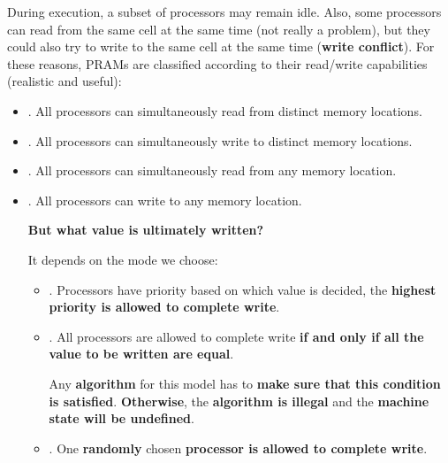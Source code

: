 During execution, a subset of processors may remain idle. Also, some processors can read from the same cell at the same time (not really a problem), but they could also try to write to the same cell at the same time (\textbf{write conflict}). For these reasons, PRAMs are classified according to their read/write capabilities (realistic and useful):
\begin{itemize}
    \item {}. All processors can simultaneously read from distinct memory locations.
    
    \item {}. All processors can simultaneously write to distinct memory locations.
    
    \item {}. All processors can simultaneously read from any memory location.

    \item {}. All processors can write to any memory location.
    \begin{flushleft}
        \textcolor{Green3}{ \textbf{But what value is ultimately written?}}
    \end{flushleft}
    It depends on the mode we choose:
    \begin{itemize}
        \item {}. Processors have priority based on which value is decided, the \textbf{highest priority is allowed to complete write}.

        \item {}. All processors are allowed to complete write \textbf{if and only if all the value to be written are equal}.
        
        Any \textbf{algorithm} for this model has to \textbf{make sure that this condition is satisfied}. \textbf{Otherwise}, the \textbf{algorithm is illegal} and the \textbf{machine state will be undefined}.

        \item {}. One \textbf{randomly} chosen \textbf{processor is allowed to complete write}.
    \end{itemize}
\end{itemize}

